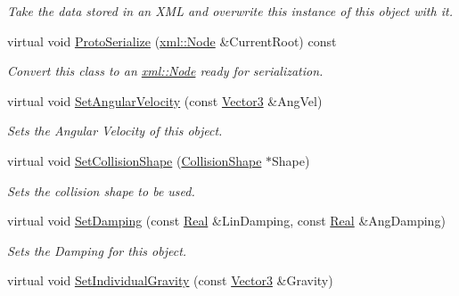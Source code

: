 \begin{DoxyCompactItemize}
\begin{DoxyCompactList}\small\item\em Take the data stored in an XML and overwrite this instance of this object with it. \item\end{DoxyCompactList}\item 
virtual void \hyperlink{classMezzanine_1_1ActorRigidPhysicsSettings_ab3977a3b5939b9e68657b84b5a80a24d}{ProtoSerialize} (\hyperlink{classMezzanine_1_1xml_1_1Node}{xml::Node} \&CurrentRoot) const 
\begin{DoxyCompactList}\small\item\em Convert this class to an \hyperlink{classMezzanine_1_1xml_1_1Node}{xml::Node} ready for serialization. \item\end{DoxyCompactList}\item 
virtual void \hyperlink{classMezzanine_1_1ActorRigidPhysicsSettings_a0e5b8a968b6f41dfeebd0fcfc01c6458}{SetAngularVelocity} (const \hyperlink{classMezzanine_1_1Vector3}{Vector3} \&AngVel)
\begin{DoxyCompactList}\small\item\em Sets the Angular Velocity of this object. \item\end{DoxyCompactList}\item 
virtual void \hyperlink{classMezzanine_1_1ActorRigidPhysicsSettings_a7583e5afc93dedc8a4403ea156fa0413}{SetCollisionShape} (\hyperlink{classMezzanine_1_1CollisionShape}{CollisionShape} $\ast$Shape)
\begin{DoxyCompactList}\small\item\em Sets the collision shape to be used. \item\end{DoxyCompactList}\item 
virtual void \hyperlink{classMezzanine_1_1ActorRigidPhysicsSettings_a9342e7ff1f485ddf99930f24e081084a}{SetDamping} (const \hyperlink{namespaceMezzanine_a726731b1a7df72bf3583e4a97282c6f6}{Real} \&LinDamping, const \hyperlink{namespaceMezzanine_a726731b1a7df72bf3583e4a97282c6f6}{Real} \&AngDamping)
\begin{DoxyCompactList}\small\item\em Sets the Damping for this object. \item\end{DoxyCompactList}\item 
virtual void \hyperlink{classMezzanine_1_1ActorRigidPhysicsSettings_ad1280574ff86c008c46c10a7133ca274}{SetIndividualGravity} (const \hyperlink{classMezzanine_1_1Vector3}{Vector3} \&Gravity)

\end{DoxyCompactItemize}
